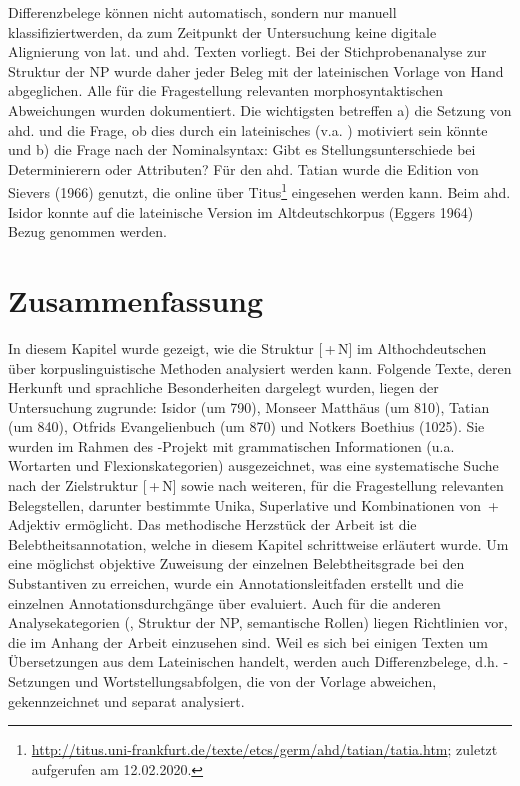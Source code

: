 Differenzbelege  können nicht automatisch, sondern nur manuell klassifiziert\linebreak werden, da zum Zeitpunkt der Untersuchung keine digitale Alignierung von lat. und ahd. Texten vorliegt. Bei der Stichprobenanalyse zur Struktur  der NP  wurde daher jeder Beleg mit der lateinischen Vorlage von Hand abgeglichen. Alle für die Fragestellung relevanten morphosyntaktischen Abweichungen wurden dokumentiert. Die wichtigsten betreffen a) die Setzung von ahd.  und die Frage, ob dies durch ein lateinisches  (v.a. ) motiviert sein könnte und b) die Frage nach der Nominalsyntax: Gibt es Stellungsunterschiede  bei  Determinierern oder Attributen? Für den ahd. Tatian wurde die Edition von Sievers (1966) genutzt, die online über Titus\footnote{\url{http://titus.uni-frankfurt.de/texte/etcs/germ/ahd/tatian/tatia.htm}; zuletzt aufgerufen am 12.02.2020.} eingesehen werden kann. Beim ahd. Isidor konnte auf die lateinische Version im Altdeutschkorpus  (Eggers 1964) Bezug genommen werden.  


\section{Zusammenfassung}

In diesem Kapitel wurde gezeigt, wie die Struktur [\,+\,N] im Althochdeutschen über korpuslinguistische  Methoden analysiert werden kann. Folgende Texte, deren Herkunft und sprachliche Besonderheiten dargelegt wurden, liegen der Untersuchung zugrunde: Isidor (um 790), Monseer Matthäus (um 810), Tatian (um 840), Otfrids Evangelienbuch (um 870) und Notkers Boethius (1025). Sie wurden im Rahmen des -Projekt  mit grammatischen Informationen (u.a. Wortarten und  Flexionskategorien) ausgezeichnet, was eine systematische Suche nach der Zielstruktur [\,+\,N] sowie nach weiteren, für die Fragestellung relevanten Belegstellen, darunter bestimmte  Unika, Superlative  und Kombinationen von \,+\,Adjektiv  ermöglicht. Das methodische Herzstück der Arbeit ist die Belebtheitsannotation, welche in diesem Kapitel schrittweise erläutert wurde. Um eine möglichst objektive  Zuweisung der einzelnen Belebtheitsgrade bei den Substantiven  zu erreichen, wurde ein Annotationsleitfaden  erstellt und die einzelnen  Annotationsdurchgänge über  evaluiert. Auch für die anderen Analysekategorien (, Struktur der  NP, semantische  Rollen) liegen Richtlinien vor, die im Anhang \parencite{HZKYL4_2020} der Arbeit einzusehen sind. Weil es sich bei einigen Texten um Übersetzungen aus dem Lateinischen handelt, werden auch  Differenzbelege, d.h. -Setzungen  und  Wortstellungsabfolgen, die von der Vorlage abweichen, gekennzeichnet und separat analysiert. 
  
